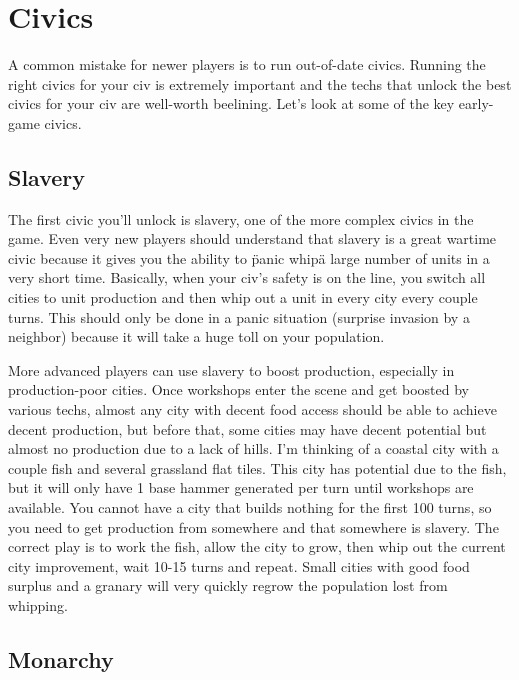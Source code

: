 \documentclass[10pt]{article}
\begin{document}
\section*{Civics}

A common mistake for newer players is to run out-of-date
civics. Running the right civics for your civ is extremely important
and the techs that unlock the best civics for your civ are well-worth
beelining. Let's look at some of the key early-game civics.

\subsection*{Slavery}

The first civic you'll unlock is slavery, one of the more complex
civics in the game. Even very new players should understand that
slavery is a great wartime civic because it gives you the ability to
\"panic whip\" a large number of units in a very short
time. Basically, when your civ's safety is on the line, you switch all
cities to unit production and then whip out a unit in every city every
couple turns. This should only be done in a panic situation (surprise
invasion by a neighbor) because it will take a huge toll on your
population.

More advanced players can use slavery to boost production, especially
in production-poor cities.  Once workshops enter the scene and get
boosted by various techs, almost any city with decent food access
should be able to achieve decent production, but before that, some
cities may have decent potential but almost no production due to a
lack of hills. I'm thinking of a coastal city with a couple fish and
several grassland flat tiles. This city has potential due to the fish,
but it will only have 1 base hammer generated per turn until workshops
are available. You cannot have a city that builds nothing for the
first 100 turns, so you need to get production from somewhere and that
somewhere is slavery. The correct play is to work the fish, allow the
city to grow, then whip out the current city improvement, wait 10-15
turns and repeat. Small cities with good food surplus and a granary
will very quickly regrow the population lost from whipping.

\subsection*{Monarchy}
\end{document}
